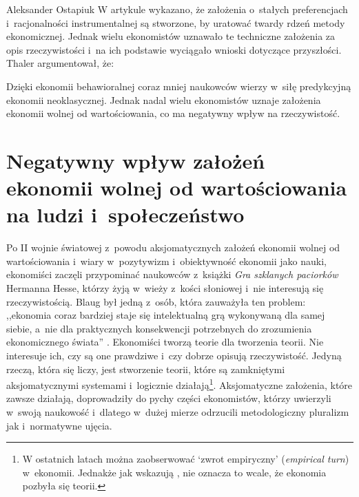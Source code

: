 \begin{artplenv}{Aleksander Ostapiuk}
W artykule wykazano, że założenia o~stałych preferencjach i~racjonalności instrumentalnej są stworzone, by uratować
twardy rdzeń metody ekonomicznej. Jednak wielu ekonomistów uznawało te techniczne założenia za opis rzeczywistości i~na
ich podstawie wyciągało wnioski dotyczące przyszłości. Thaler argumentował, że:

Dzięki ekonomii behawioralnej coraz mniej naukowców wierzy w~siłę predykcyjną ekonomii neoklasycznej. Jednak nadal wielu
ekonomistów uznaje założenia ekonomii wolnej od wartościowania, co ma negatywny wpływ na rzeczywistość. 

\section{Negatywny wpływ założeń ekonomii wolnej od wartościowania na ludzi i~społeczeństwo}
Po II wojnie światowej z~powodu aksjomatycznych założeń ekonomii wolnej od
wartościowania i~wiary w~pozytywizm i~obiektywność ekonomii jako nauki,
ekonomiści zaczęli przypominać naukowców z~książki \textit{Gra szklanych paciorków}
Hermanna Hesse, którzy żyją w~wieży z~kości słoniowej i~nie interesują się rzeczywistością. Blaug był jedną z~osób,
która zauważyła ten problem: ,,ekonomia coraz bardziej staje się intelektualną grą wykonywaną dla samej siebie, a~nie dla
praktycznych konsekwencji potrzebnych do zrozumienia ekonomicznego świata''
\parencite[s.~3]{blaug_ugly_1997}.
Ekonomiści tworzą teorie dla tworzenia teorii.
Nie interesuje ich, czy są one prawdziwe i~czy dobrze opisują rzeczywistość.
Jedyną rzeczą, która się liczy, jest stworzenie teorii, które są zamkniętymi aksjomatycznymi
systemami i~logicznie działają\footnote{W ostatnich latach można zaobserwować `zwrot empiryczny'
(\textit{empirical turn}) w~ekonomii.
Jednakże jak wskazują
\parencite{backhouse_age_2017},
nie oznacza to wcale, że ekonomia
pozbyła się teorii.}. Aksjomatyczne założenia, które zawsze działają, doprowadziły do pychy części ekonomistów, którzy
uwierzyli w~swoją naukowość i~dlatego w~dużej mierze odrzucili metodologiczny pluralizm jak i~normatywne ujęcia.


\end{artplenv}
